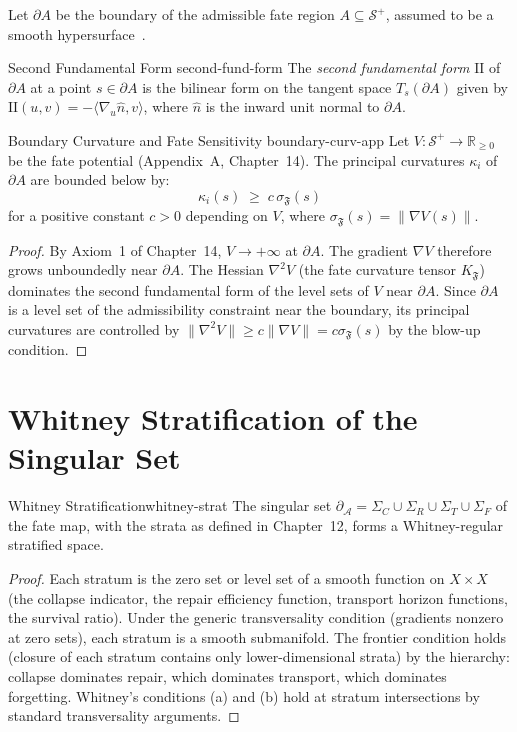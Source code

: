 \documentclass[12pt,twoside,openright]{book}
\newcommand{\distPairs}{X\times X}
\newcommand{\fateMap}{\mathfrak{F}}
\newcommand{\fateSpace}{\mathcal{S}}
\newcommand{\fateSens}[1]{\sigma_{\fateMap}(#1)}
\newcommand{\singSet}{\partial_{\!\mathcal{A}}}
\newcommand{\strataC}{\Sigma_{C}}   %
\newcommand{\strataR}{\Sigma_{R}}   %
\newcommand{\strataT}{\Sigma_{T}}   %
\newcommand{\strataF}{\Sigma_{F}}   %
\newcommand{\admRegion}{A}
\providecommand{\strataC}{\Sigma_{C}}
\providecommand{\strataR}{\Sigma_{R}}
\providecommand{\strataT}{\Sigma_{T}}
\providecommand{\strataF}{\Sigma_{F}}
\providecommand{\fatePos}{\fateSpace^{+}}
\providecommand{\fateSens}[1]{\sigma_{\fateMap}(#1)}
\providecommand{\singSet}{\partial_{\!\mathcal{A}}}
\providecommand{\admRegion}{A}
\providecommand{\fatePot}{V}
\providecommand{\fateKurv}{K_{\fateMap}}
\providecommand{\secondForm}{\mathrm{II}}
\begin{document}
Let $\partial\admRegion$ be the boundary of the admissible
fate region $\admRegion\subseteq\fatePos$, assumed to be a
smooth hypersurface~\cite{lee2013}.

\begin{definition}{Second Fundamental Form}%
  {second-fund-form}
The \emph{second fundamental form} $\secondForm$ of
$\partial\admRegion$ at a point $s\in\partial\admRegion$ is
the bilinear form on the tangent space
$T_s(\partial\admRegion)$ given by
$\secondForm(u,v)=-\langle\nabla_u\hat{n},v\rangle$,
where $\hat{n}$ is the inward unit normal to $\partial\admRegion$.
\end{definition}

\begin{theorem}{Boundary Curvature and Fate Sensitivity}%
  {boundary-curv-app}
Let $\fatePot:\fatePos\to\mathbb{R}_{\ge0}$ be the fate
potential (Appendix~A, Chapter~14). The principal curvatures
$\kappa_i$ of $\partial\admRegion$ are bounded below by:
\[
  \kappa_i(s)
  \;\ge\;
  c\,\fateSens{s}
\]
for a positive constant $c>0$ depending on $\fatePot$,
where $\fateSens{s}=\|\nabla\fatePot(s)\|$.
\begin{proof}
By Axiom~1 of Chapter~14, $\fatePot\to+\infty$ at
$\partial\admRegion$. The gradient $\nabla\fatePot$ therefore
grows unboundedly near $\partial\admRegion$. The Hessian
$\nabla^2\fatePot$ (the fate curvature tensor $\fateKurv$)
dominates the second fundamental form of the level sets of
$\fatePot$ near $\partial\admRegion$. Since $\partial\admRegion$
is a level set of the admissibility constraint near the
boundary, its principal curvatures are controlled by
$\|\nabla^2\fatePot\|\ge c\|\nabla\fatePot\|=c\fateSens{s}$
by the blow-up condition.
\end{proof}
\end{theorem}

\section{Whitney Stratification of the Singular Set}

\begin{theorem}{Whitney Stratification}{whitney-strat}
The singular set $\singSet=\strataC\cup\strataR\cup\strataT
\cup\strataF$ of the fate map, with the strata as defined
in Chapter~12, forms a Whitney-regular stratified space.
\begin{proof}
Each stratum is the zero set or level set of a smooth
function on $\distPairs$ (the collapse indicator, the
repair efficiency function, transport horizon functions,
the survival ratio). Under the generic transversality
condition (gradients nonzero at zero sets), each stratum
is a smooth submanifold. The frontier condition holds
(closure of each stratum contains only lower-dimensional
strata) by the hierarchy: collapse dominates repair, which
dominates transport, which dominates forgetting. Whitney's
conditions (a) and (b) hold at stratum intersections by
standard transversality arguments.
\end{proof}
\end{theorem}
\end{document}
